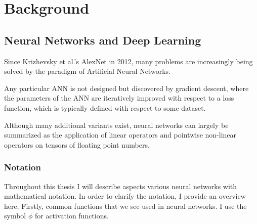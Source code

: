 \chapter{Background}
\label{C:background}


\section{Neural Networks and Deep Learning}

Since Krizhevsky et al.'s AlexNet in 2012, many problems are increasingly being solved by the paradigm of Artificial Neural Networks.

Any particular ANN is not designed but discovered by gradient descent, where the parameters of the ANN are iteratively improved with respect to a loss function, which is typically defined with respect to some dataset.

Although many additional variants exist, neural networks can largely be summarized as the application of linear operators and pointwise non-linear operators on tensors of floating point numbers.

\subsection{Notation}
\label{ss:dl-notation}


Throughout this thesis I will describe aspects various neural networks with mathematical notation. In order to clarify the notation, I provide an overview here. Firstly, common functions that we see used in neural networks. I use the symbol $\phi$ for activation functions.

